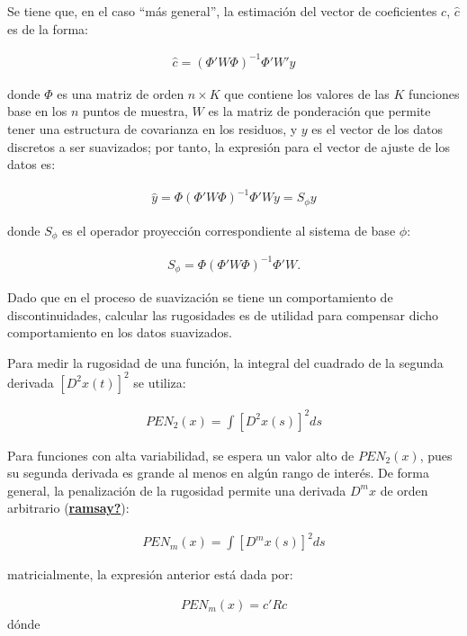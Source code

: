 \documentclass[
]{book}
\begin{document}
Se tiene que, en el caso ``más general'', la estimación del vector de coeficientes \(c\), \({\hat{c}}\) es de la forma:

\begin{align}
    {\hat{c}}=(\Phi'W\Phi)^{-1}\Phi'W'y
\end{align}

donde \(\Phi\) es una matriz de orden \(n \times K\) que contiene los valores de las \(K\) funciones base en los \(n\) puntos de muestra, \(W\) es la matriz de ponderación que permite tener una estructura de covarianza en los residuos, y \(y\) es el vector de los datos discretos a ser suavizados; por tanto, la expresión para el vector de ajuste de los datos es:

\begin{align}
    {\hat{y}}=\Phi(\Phi'W\Phi)^{-1} \Phi'Wy=S_\phi y
\end{align}

donde \(S_\phi\) es el operador proyección correspondiente al sistema de base \(\phi\):

\begin{align}
    S_\phi=\Phi(\Phi'W\Phi)^{-1} \Phi'W.
\end{align}

Dado que en el proceso de suavización se tiene un comportamiento de discontinuidades, calcular las rugosidades es de utilidad para compensar dicho comportamiento en los datos suavizados.

Para medir la rugosidad de una función, la integral del cuadrado de la segunda derivada \([D^2x(t)]^2\) se utiliza:

\begin{align}
    PEN_2(x)=\int[D^2x(s)]^2ds
\end{align}

Para funciones con alta variabilidad, se espera un valor alto de \(PEN_2(x)\), pues su segunda derivada es grande al menos en algún rango de interés. De forma general, la penalización de la rugosidad permite una derivada \(D^mx\) de orden arbitrario (\protect\hyperlink{ref-ramsay}{\textbf{ramsay?}}):

\begin{align}
    PEN_m(x)=\int[D^mx(s)]^2ds
\end{align}

matricialmente, la expresión anterior está dada por:

\begin{align}
    PEN_m(x)=c'Rc
 \end{align} dónde
\end{document}

